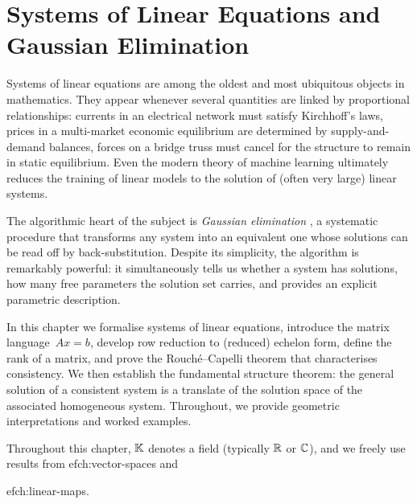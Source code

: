 
\chapter{Systems of Linear Equations and Gaussian Elimination}%
\label{ch:linear-systems}


Systems of linear equations are among the oldest and most ubiquitous
objects in mathematics. They appear whenever several quantities are
linked by proportional relationships: currents in an electrical
network must satisfy Kirchhoff's laws, prices in a multi-market
economic equilibrium are determined by supply-and-demand balances,
forces on a bridge truss must cancel for the structure to remain
in static equilibrium. Even the modern theory of machine learning
ultimately reduces the training of linear models to the solution of
(often very large) linear systems.

The algorithmic heart of the subject is \emph{Gaussian elimination}%
, a systematic procedure that transforms
any system into an equivalent one whose solutions can be read off by
back-substitution. Despite its simplicity, the algorithm is
remarkably powerful: it simultaneously tells us whether a system has
solutions, how many free parameters the solution set carries, and
provides an explicit parametric description.

In this chapter we formalise systems of linear equations, introduce
the matrix language~$Ax=b$, develop row reduction to (reduced) echelon
form, define the rank of a matrix, and prove the
Rouch\'{e}--Capelli theorem that characterises consistency. We then
establish the fundamental structure theorem: the general solution of a
consistent system is a translate of the solution space of the
associated homogeneous system. Throughout, we provide geometric
interpretations and worked examples.

\medskip
Throughout this chapter, ${\mathbb{K}}$ denotes a field (typically ${\mathbb{R}}$ or ${\mathbb{C}}$),
and we freely use results from 
ef{ch:vector-spaces} and

ef{ch:linear-maps}.



